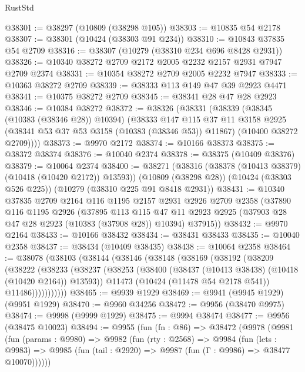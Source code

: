 \begin{lexlean}{RustStd}
\begin{coremodule}
@38301 := @38297 (@10809 (@38298 @105))
@38303 := @10835 @54 @2178
@38307 := @38301 (@10424 (@38303 @91 @234))
@38310 := @10843 @37835 @54 @2709
@38316 := @38307 (@10279 (@38310 @234 @696 @8428 @2931))
@38326 := @10340 @38272 @2709 @2172 @2005 @2232 @2157 @2931 @7947 @2709 @2374
@38331 := @10354 @38272 @2709 @2005 @2232 @7947
@38333 := @10363 @38272 @2709
@38339 := @38333 @113 @149 @47 @39 @2923 @4471
@38341 := @10375 @38272 @2709
@38345 := @38341 @28 @47 @28 @2923
@38346 := @10384 @38272
@38372 := @38326
    (@38331
      (@38339
        (@38345 (@10383 (@38346 @28)) @10394)
        (@38333
          @147
          @115
          @37
          @11
          @3158
          @2925
          (@38341 @53 @37 @53 @3158 (@10383 (@38346 @53)) @11867)
          (@10400 @38272 @2709))))
@38373 := @9970 @2172
@38374 := @10166 @38373
@38375 := @38372 @38374
@38376 := @10040 @2374
@38378 := @38375 (@10409 @38376)
@38379 := @10064 @2374
@38400 := @38271
    (@38316 (@38378 (@10413 @38379) (@10418 (@10420 @2172)) @13593))
    (@10809 (@38298 @28))
    (@10424 (@38303 @526 @225))
    (@10279 (@38310 @225 @91 @8418 @2931))
@38431 := @10340
    @37835
    @2709
    @2164
    @116
    @1195
    @2157
    @2931
    @2926
    @2709
    @2358
    (@37890
      @116
      @1195
      @2926
      (@37895
        @113
        @115
        @47
        @11
        @2923
        @2925
        (@37903 @28 @47 @28 @2923 (@10383 (@37908 @28)) @10394)
        @37915))
@38432 := @9970 @2164
@38433 := @10166 @38432
@38434 := @38431 @38433
@38435 := @10040 @2358
@38437 := @38434 (@10409 @38435)
@38438 := @10064 @2358
@38464 := @38078
    (@38103
      (@38144
        (@38146
          (@38148
            (@38169
              (@38192
                (@38209
                  (@38222
                    (@38233
                      (@38237
                        (@38253
                          (@38400 (@38437 (@10413 @38438) (@10418 (@10420 @2164)) @13593))
                          @11473
                          (@10424 (@11478 @54 @2178 @541))
                          @11486)))))))))))
@38465 := @9939 @1929
@38469 := @9941 (@9945 @1929) (@9951 @1929)
@38470 := @9960 @34256
@38472 := @9956 (@38470 @9975)
@38474 := @9998 (@9999 @1929)
@38475 := @9994 @38474
@38477 := @9956 (@38475 @10023)
@38494 := @9955
    (fun (fn : @86) =>
    @38472
      (@9978
        (@9981
          (fun (params : @9980) =>
          @9982
            (fun (rty : @2568) =>
            @9984
              (fun (lets : @9983) =>
              @9985 (fun (tail : @2920) => @9987 (fun (Γ : @9986) => @38477 @10070))))))

\end{coremodule}
\end{lexlean}
